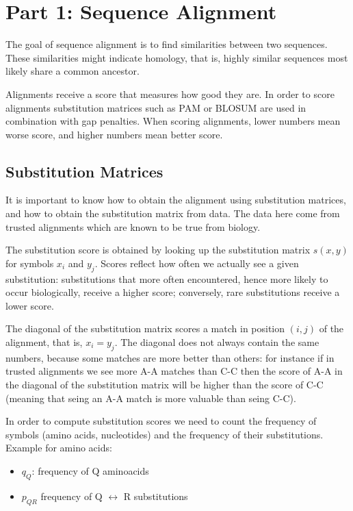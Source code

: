 \section{Part 1: Sequence Alignment}

The goal of sequence alignment is to find similarities between two sequences. These similarities might indicate homology, that is, highly similar sequences most likely share a common ancestor.

Alignments receive a score that measures how good they are.
In order to score alignments substitution matrices such as PAM or BLOSUM are used in combination with gap penalties.
When scoring alignments, lower numbers mean worse score, and higher numbers mean better score.

\subsection{Substitution Matrices}
\label{sec:substmats}

It is important to know how to obtain the alignment using substitution matrices, and how to obtain the substitution matrix from data. The data here come from trusted alignments which are known to be true from biology.

The substitution score is obtained by looking up the substitution matrix $s(x,y)$ for symbols $x_i$ and $y_j$.
Scores reflect how often we actually see a given substitution: substitutions that more often encountered, hence more likely to occur biologically, receive a higher score; conversely, rare substitutions receive a lower score.

The diagonal of the substitution matrix scores a match in position $(i,j)$ of the alignment, that is, $x_i = y_j$.
The diagonal does not always contain the same numbers, because some matches are more better than others: for instance if in trusted alignments we see more A-A
matches than C-C then the score of A-A in the diagonal of the substitution matrix will be higher than the score of C-C (meaning that seing an A-A match is more valuable than seing C-C).

In order to compute substitution scores we need to count the frequency of symbols (amino acids, nucleotides) and the frequency of their substitutions. Example for amino acids:
\begin{itemize}
\item $q_Q$: frequency of Q aminoacids
\item $p_{QR}$ frequency of Q $\leftrightarrow$ R substitutions
\end{itemize}

